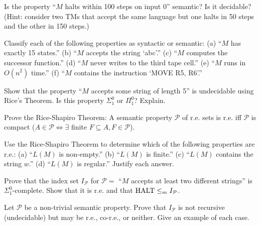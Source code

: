 \begin{exercise}[Basic]
Is the property ``$M$ halts within 100 steps on input $0$'' semantic? Is it decidable? (Hint: consider two TMs that accept the same language but one halts in 50 steps and the other in 150 steps.)
\end{exercise}

\begin{exercise}[Basic]
Classify each of the following properties as syntactic or semantic:
(a) ``$M$ has exactly 15 states.''
(b) ``$M$ accepts the string `abc'.''
(c) ``$M$ computes the successor function.''
(d) ``$M$ never writes to the third tape cell.''
(e) ``$M$ runs in $O(n^2)$ time.''
(f) ``$M$ contains the instruction `MOVE R5, R6'.''
\end{exercise}

\begin{exercise}[Basic]
Show that the property ``$M$ accepts some string of length 5'' is undecidable using Rice's Theorem. Is this property $\Sigma^0_1$ or $\Pi^0_1$? Explain.
\end{exercise}

\begin{exercise}[Intermediate]
Prove the Rice-Shapiro Theorem: A semantic property $\mathcal{P}$ of r.e. sets is r.e. iff $\mathcal{P}$ is compact ($A \in \mathcal{P} \iff \exists$ finite $F \subseteq A, F \in \mathcal{P}$).
\end{exercise}

\begin{exercise}[Intermediate]
Use the Rice-Shapiro Theorem to determine which of the following properties are r.e.:
(a) ``$L(M)$ is non-empty.''
(b) ``$L(M)$ is finite.''
(c) ``$L(M)$ contains the string $w$.''
(d) ``$L(M)$ is regular.''
Justify each answer.
\end{exercise}

\begin{exercise}[Intermediate]
Prove that the index set $I_\mathcal{P}$ for $\mathcal{P} =$ ``$M$ accepts at least two different strings'' is $\Sigma^0_1$-complete. Show that it is r.e. and that $\text{HALT} \leq_m I_\mathcal{P}$.
\end{exercise}

\begin{exercise}[Intermediate]
Let $\mathcal{P}$ be a non-trivial semantic property. Prove that $I_\mathcal{P}$ is not recursive (undecidable) but may be r.e., co-r.e., or neither. Give an example of each case.
\end{exercise}

